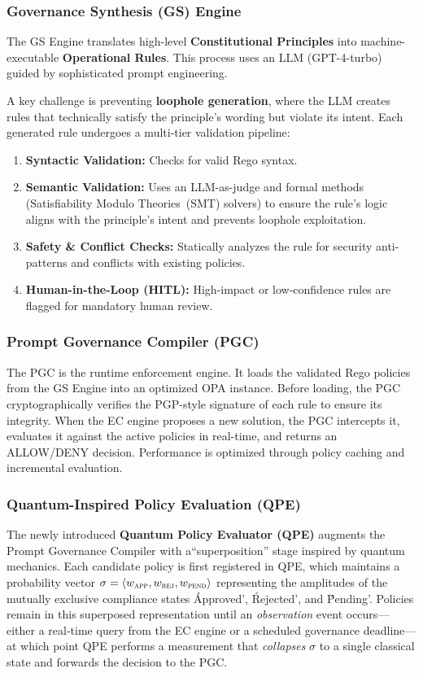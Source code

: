 \subsubsection{Governance Synthesis (GS) Engine}
The GS Engine translates high-level \textbf{Constitutional Principles} into machine-executable \textbf{Operational Rules}. This process uses an LLM (GPT-4-turbo) guided by sophisticated prompt engineering.

A key challenge is preventing \textbf{loophole generation}, where the LLM creates rules that technically satisfy the principle's wording but violate its intent. Each generated rule undergoes a multi-tier validation pipeline:

\begin{enumerate}[leftmargin=*,topsep=2pt,itemsep=1pt,parsep=0pt]
\item \textbf{Syntactic Validation:} Checks for valid Rego syntax.
\item \textbf{Semantic Validation:} Uses an LLM-as-judge and formal methods (Satisfiability Modulo Theories~(SMT) solvers) to ensure the rule's logic aligns with the principle's intent and prevents loophole exploitation.
\item \textbf{Safety \& Conflict Checks:} Statically analyzes the rule for security anti-patterns and conflicts with existing policies.
\item \textbf{Human-in-the-Loop (HITL):} High-impact or low-confidence rules are flagged for mandatory human review.
\end{enumerate}

\subsubsection{Prompt Governance Compiler (PGC)}
The PGC is the runtime enforcement engine. It loads the validated Rego policies from the GS Engine into an optimized OPA instance. Before loading, the PGC cryptographically verifies the PGP-style signature of each rule to ensure its integrity. When the EC engine proposes a new solution, the PGC intercepts it, evaluates it against the active policies in real-time, and returns an ALLOW/DENY decision. Performance is optimized through policy caching and incremental evaluation.

\subsubsection{Quantum-Inspired Policy Evaluation (QPE)}
The newly introduced \textbf{Quantum Policy Evaluator (QPE)} augments the Prompt Governance Compiler with a\break ``superposition'' stage inspired by quantum mechanics.  Each candidate policy is first registered in QPE, which maintains a probability vector $\sigma = \langle w_{\textsc{app}}, w_{\textsc{rej}}, w_{\textsc{pend}} \rangle$ representing the amplitudes of the mutually exclusive compliance states \'Approved', \'Rejected', and \'Pending'.  Policies remain in this superposed representation until an \emph{observation} event occurs—either a real‐time query from the EC engine or a scheduled governance deadline—at which point QPE performs a measurement that \emph{collapses} $\sigma$ to a single classical state and forwards the decision to the PGC.

